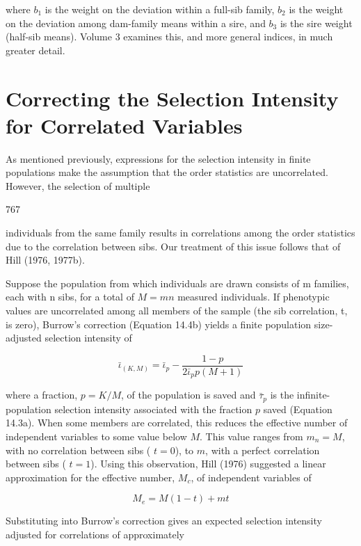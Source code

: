 \documentclass{article}
\begin{document}
where  $ b_{1} $ is the weight on the deviation within a full-sib family,  $ b_{2} $ is the weight on the deviation among dam-family means within a sire, and  $ b_{3} $ is the sire weight (half-sib means). Volume 3 examines this, and more general indices, in much greater detail.

\section{Correcting the Selection Intensity for Correlated Variables}
As mentioned previously, expressions for the selection intensity in finite populations make the assumption that the order statistics are uncorrelated. However, the selection of multiple

767

individuals from the same family results in correlations among the order statistics due to the correlation between sibs. Our treatment of this issue follows that of Hill (1976, 1977b).

Suppose the population from which individuals are drawn consists of m families, each with n sibs, for a total of  $ M = mn $ measured individuals. If phenotypic values are uncorrelated among all members of the sample (the sib correlation, t, is zero), Burrow's correction (Equation 14.4b) yields a finite population size-adjusted selection intensity of

\begin{equation}
\bar{\iota}_{(K,M)}=\bar{\iota}_{p}-\frac{1-p}{2\bar{\iota}_{p}p(M+1)}
\end{equation}

where a fraction,  $ p = K/M $, of the population is saved and  $ \bar{\tau}_p $ is the infinite-population selection intensity associated with the fraction  $ p $ saved (Equation 14.3a). When some members are correlated, this reduces the effective number of independent variables to some value below  $ M $. This value ranges from  $ m_n = M $, with no correlation between sibs ( $ t = 0 $), to  $ m $, with a perfect correlation between sibs ( $ t = 1 $). Using this observation, Hill (1976) suggested a linear approximation for the effective number,  $ M_c $, of independent variables of

\begin{equation}
M_{e}=M(1-t)+m t
\tag{21.57a}
\label{eq:21_57a}
\end{equation}

Substituting into Burrow's correction gives an expected selection intensity adjusted for correlations of approximately
\end{document}
